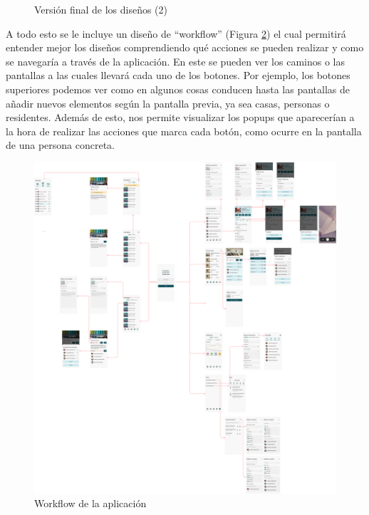 \begin{figure}[hp!]
    \caption{Versión final de los diseños (2)}
    \label{fig:dis-fin2}

\end{figure}

\newpage

A todo esto se le incluye un diseño de ``workflow'' (Figura \ref{fig:workflow}) el cual permitirá entender mejor los diseños comprendiendo qué acciones se pueden realizar y como se navegaría a través de la aplicación. En este se pueden ver los caminos o las pantallas a las cuales llevará cada uno de los botones. Por ejemplo, los botones superiores podemos ver como en algunos cosas conducen hasta las pantallas de añadir nuevos elementos según la pantalla previa, ya sea casas, personas o residentes. Además de esto, nos permite visualizar los popups que aparecerían a la hora de realizar las acciones que marca cada botón, como ocurre en la pantalla de una persona concreta. 

\begin{figure}[h!]
    \centering
    \includegraphics[width=\linewidth]{diseno/app/presentacion/workflow.png}
    \caption{Workflow de la aplicación}
    \label{fig:workflow}
\end{figure}

